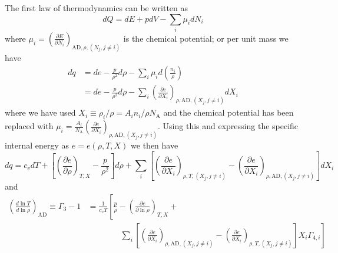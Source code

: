 The first law of thermodynamics can be written as
\[
dQ = dE + pdV - \sum_i\mu_idN_i
\]
where $\mu_i=\left(
\frac{\partial E}{\partial N_i}\right)_{\text{AD},\rho,(N_j,j\neq i)}$ is
the chemical potential; or per unit mass we have
\begin{align*}
  dq &= de - \frac{p}{\rho^2}d\rho - \sum_i\mu_id
  \left(\frac{n_i}{\rho}\right)\\
  &= de - \frac{p}{\rho^2}d\rho - \sum_i
  \left(
  \frac{\partial e}{\partial X_i}\right)_{\rho,\text{AD},(X_j,j\neq i)}dX_i
\end{align*}
where we have used $X_i \equiv \rho_i/\rho = A_in_i/\rho N_\text{A}$ 
and the chemical potential has been replaced with 
$\mu_i = \frac{A_i}{N_\text{A}}\left(\frac{\partial e}{\partial X_i}
  \right)_{\rho,\text{AD},(X_j,j\neq i)}$.
Using this and expressing the specific internal energy as $e=e(\rho,T,X)$ 
we then have
\[
dq = c_vdT +
\left[\left(\frac{\partial e}{\partial \rho}\right)_{T,X} -\frac{p}{\rho^2}
  \right]d\rho + 
\sum_i\left[
  \left(\frac{\partial e}{\partial X_i}\right)_{\rho,T,(X_j,j\neq i)} -
  \left(\frac{\partial e}{\partial X_i}
  \right)_{\rho,\text{AD},(X_j,j\neq i)}\right]dX_i
\]
and
\begin{align}\label{eq:gamma3_first}
\left(\frac{d\ln T}{d\ln\rho}\right)_\text{AD} \equiv \Gamma_3-1
&= \frac{1}{c_vT}\left[
\frac{p}{\rho} - \left(\frac{\partial e}{\partial\ln\rho}\right)_{T,X} + 
\right.{}\nonumber\\
&\qquad\qquad  \left.\sum_i \left[
    \left(
    \frac{\partial e}{\partial X_i}\right)_{\rho,\text{AD},(X_j,j\neq i)} 
    - 
    \left(\frac{\partial e}{\partial X_i}\right)_{\rho,T,(X_j,j\neq i)}
    \right]X_i\Gamma_{4,i}\right]
\end{align}

